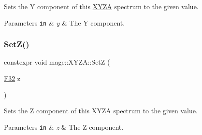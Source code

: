 Sets the Y component of this \mbox{\hyperlink{structmage_1_1_x_y_z_a}{X\+Y\+ZA}} spectrum to the given value.


\begin{DoxyParams}[1]{Parameters}
\mbox{\tt in}  & {\em y} & The Y component. \\
\hline
\end{DoxyParams}
\mbox{\label{structmage_1_1_x_y_z_a_aabbeb3087741702e0d94ec989b516652}} 
\subsubsection{\texorpdfstring{Set\+Z()}{SetZ()}}
{\footnotesize\ttfamily constexpr void mage\+::\+X\+Y\+Z\+A\+::\+SetZ (\begin{DoxyParamCaption}\item[{\mbox{\hyperlink{namespacemage_aa97e833b45f06d60a0a9c4fc22ae02c0}{F32}}}]{z }\end{DoxyParamCaption})\hspace{0.3cm}{\ttfamily [noexcept]}}

Sets the Z component of this \mbox{\hyperlink{structmage_1_1_x_y_z_a}{X\+Y\+ZA}} spectrum to the given value.


\begin{DoxyParams}[1]{Parameters}
\mbox{\tt in}  & {\em z} & The Z component. \\
\hline
\end{DoxyParams}

